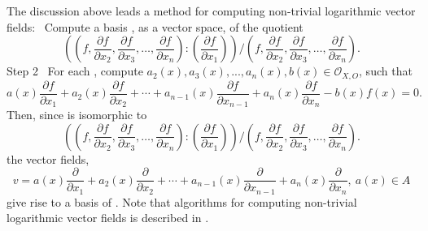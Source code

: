 \documentclass{arxsigma}
\begin{document}
The discussion above leads a method for computing non-trivial logarithmic vector fields:
\vspace{1ex}
 \ Compute a basis  , as a vector space, of the quotient
\begin{equation*}
\left(\left(f, \frac{\partial f}{\partial x_2}, \frac{\partial f}{\partial x_3},\ldots,\frac{\partial f}{\partial x_{n}}\right) : \left(\frac{\partial f}{\partial x_1}\right)\right)/\left(f, \frac{\partial f}{\partial x_2}, \frac{\partial f}{\partial x_3},\ldots,\frac{\partial f}{\partial x_{n}}\right).
\end{equation*}{\rm Step 2} \ For each  , compute $ a_2(x), a_3(x),...,a_n(x), b(x)
\in{\mathcal O}_{X,O} $, such that
\begin{equation*}
a(x)\frac{\partial f}{\partial x_1} + a_2(x)\frac{\partial f}{\partial x_2} + \cdots + a_{n-1}(x)\frac{\partial f}{\partial x_{n-1}}+ a_n(x)\frac{\partial f}{\partial x_n} - b(x)f(x) =0.
\end{equation*}
Then, since
  is isomorphic to
\begin{equation*}
\left(\left(f, \frac{\partial f}{\partial x_2}, \frac{\partial f}{\partial x_3},\ldots,\frac{\partial f}{\partial x_{n}}\right) : \left(\frac{\partial f}{\partial x_1}\right)\right)/\left(f, \frac{\partial f}{\partial x_2}, \frac{\partial f}{\partial x_3},\ldots,\frac{\partial f}{\partial x_{n}}\right).
\end{equation*}
the   vector fields,
\begin{equation*}
v= a(x)\frac{\partial }{\partial x_1} + a_2(x)\frac{\partial}{\partial x_2} + \cdots +a_{n-1}(x)\frac{\partial}{\partial x_{n-1}}+ a_n(x)\frac{\partial}{\partial x_n}, \ a(x) \in A
\end{equation*}
give rise to a basis of  .
Note that algorithms for computing non-trivial logarithmic vector fields is described in \cite{TN20}.
\end{document}
